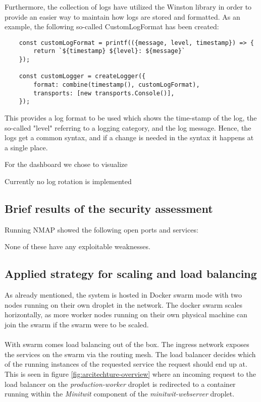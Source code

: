 Furthermore, the collection of logs have utilized the Winston library in order to provide an easier way to maintain how logs are stored and formatted.\cite{winston} As an example, the following so-called CustomLogFormat has been created:
\begin{verbatim}
    const customLogFormat = printf(({message, level, timestamp}) => {
        return `${timestamp} ${level}: ${message}`
    });
    
    const customLogger = createLogger({
        format: combine(timestamp(), customLogFormat),
        transports: [new transports.Console()],
    });
\end{verbatim}
This provides a log format to be used which shows the time-stamp of the log, the so-called "level" referring to a logging category, and the log message. Hence, the logs get a common syntax, and if a change is needed in the syntax it happens at a single place.

\noindent
For the dashboard we chose to visualize 

\noindent
Currently no log rotation is implemented

\subsection{Brief results of the security assessment}
Running NMAP showed the following open ports and services:

None of these have any exploitable weaknesses. 

\subsection{Applied strategy for scaling and load balancing}
As already mentioned, the system is hosted in Docker swarm mode with two nodes running on their own droplet in the network. The docker swarm scales horizontally, as more worker nodes running on their own physical machine can join the swarm if the swarm were to be scaled. \\
\\
With swarm comes load balancing out of the box. The ingress network exposes the services on the swarm via the routing mesh. The load balancer decides which of the running instances of the requested service the request should end up at\cite{docker-ingress}. This is seen in figure \ref{fig:arcitechture-overview} where an incoming request to the load balancer on the \textit{production-worker} droplet is redirected to a container running within the \textit{Minitwit} component of the \textit{minitwit-webserver} droplet.

